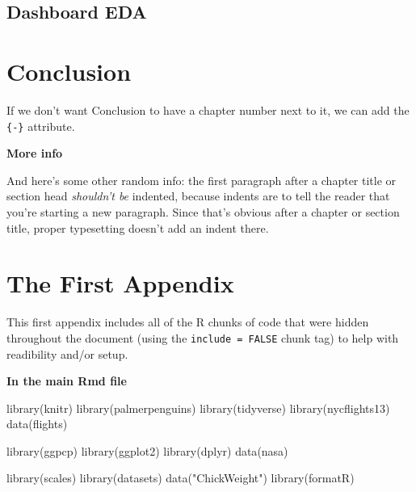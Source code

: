 \documentclass[print]{nuthesis}
\newenvironment{Shaded}{\begin{snugshade}}{\end{snugshade}}
\newcommand{\FunctionTok}[1]{\textcolor[rgb]{0.00,0.00,0.00}{#1}}
\newcommand{\NormalTok}[1]{#1}
\newcommand{\StringTok}[1]{\textcolor[rgb]{0.31,0.60,0.02}{#1}}
\begin{document}
\hypertarget{dashboard-eda}{%
\section{Dashboard EDA}\label{dashboard-eda}}

\hypertarget{conclusion-1}{%
\chapter*{Conclusion}\label{conclusion-1}}

If we don't want Conclusion to have a chapter number next to it, we can add the \texttt{\{-\}} attribute.

\textbf{More info}

And here's some other random info: the first paragraph after a chapter title or section head \emph{shouldn't be} indented, because indents are to tell the reader that you're starting a new paragraph. Since that's obvious after a chapter or section title, proper typesetting doesn't add an indent there.

\appendix

\hypertarget{the-first-appendix}{%
\chapter{The First Appendix}\label{the-first-appendix}}

This first appendix includes all of the R chunks of code that were hidden throughout the document (using the \texttt{include\ =\ FALSE} chunk tag) to help with readibility and/or setup.

\textbf{In the main Rmd file}

\begin{Shaded}
\begin{Highlighting}[]
\FunctionTok{library}\NormalTok{(knitr)}
\FunctionTok{library}\NormalTok{(palmerpenguins)}
\FunctionTok{library}\NormalTok{(tidyverse)}
\FunctionTok{library}\NormalTok{(nycflights13)}
\FunctionTok{data}\NormalTok{(flights)}

\FunctionTok{library}\NormalTok{(ggpcp)}
\FunctionTok{library}\NormalTok{(ggplot2)}
\FunctionTok{library}\NormalTok{(dplyr)}
\FunctionTok{data}\NormalTok{(nasa)}

\FunctionTok{library}\NormalTok{(scales)}
\FunctionTok{library}\NormalTok{(datasets)}
\FunctionTok{data}\NormalTok{(}\StringTok{"ChickWeight"}\NormalTok{)}
\FunctionTok{library}\NormalTok{(formatR)}
\end{Highlighting}
\end{Shaded}
\end{document}
